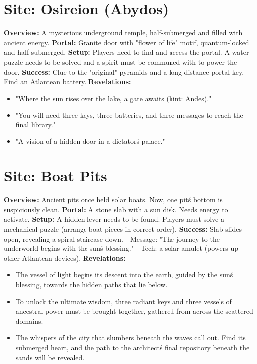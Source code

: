 \documentclass[12pt]{article}
\begin{document}
\section*{Site: Osireion (Abydos)}
\textbf{Overview:}
A mysterious underground temple, half-submerged and filled with ancient energy.
\textbf{Portal:}
Granite door with "flower of life" motif, quantum-locked and half-submerged.
\textbf{Setup:}
Players need to find and access the portal. A water puzzle needs to be solved and a spirit must be communed with to power the door.
\textbf{Success:}
Clue to the "original" pyramids and a long-distance portal key. Find an Atlantean battery.
\textbf{Revelations:}
\begin{itemize}
  \item "Where the sun rises over the lake, a gate awaits (hint: Andes)."
  \item "You will need three keys, three batteries, and three messages to reach the final library."
  \item "A vision of a hidden door in a dictator\'s palace."
\end{itemize}

\hrulefill

\section*{Site: Boat Pits}
\textbf{Overview:}
Ancient pits once held solar boats. Now, one pit\'s bottom is suspiciously clean.
\textbf{Portal:}
A stone slab with a sun disk. Needs energy to activate.
\textbf{Setup:}
A hidden lever needs to be found. Players must solve a mechanical puzzle (arrange boat pieces in correct order).
\textbf{Success:}
Slab slides open, revealing a spiral staircase down.
- Message: "The journey to the underworld begins with the sun\'s blessing."
- Tech: a solar amulet (powers up other Atlantean devices).
\textbf{Revelations:}
\begin{itemize}
  \item The vessel of light begins its descent into the earth, guided by the sun\'s blessing, towards the hidden paths that lie below.
  \item To unlock the ultimate wisdom, three radiant keys and three vessels of ancestral power must be brought together, gathered from across the scattered domains.
  \item The whispers of the city that slumbers beneath the waves call out. Find its submerged heart, and the path to the architect\'s final repository beneath the sands will be revealed.
\end{itemize}
\end{document}
